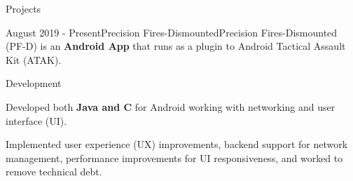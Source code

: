 \documentclass{article}
\newlength{\tabin}
\newlength{\secsep}
\newcommand{\lineunder}{\vspace*{-8pt} \\ \hspace*{-6pt} \hrulefill \\ \vspace*{-15pt}}
\newenvironment{tabbedsection}[1]{
	\begin{list}{}{
			\setlength{\itemsep}{0pt}
			\setlength{\labelsep}{0pt}
			\setlength{\labelwidth}{0pt}
			\setlength{\leftmargin}{0pt}
			\setlength{\rightmargin}{\tabin}
			\setlength{\listparindent}{0pt}
			\setlength{\parsep}{0pt}
			\setlength{\parskip}{0pt}
			\setlength{\partopsep}{0pt}
			\setlength{\topsep}{#1}
		}
		\item[]
	}{\end{list}}
\newenvironment{resume_section}[1]{
	\filbreak
	\vspace{2\secsep}
	\textsc{\color{blue}\large#1}
	\lineunder
	\begin{tabbedsection}{\secsep}
	}{\end{tabbedsection}}
\newenvironment{resume_subsection}[2]{
	\textbf{\color{BlueViolet}#2} \hfill {\normalsize (#1)} \hspace{-5em}
	\begin{tabbedsection}{0.5\secsep}
		\begin{subitems}
		}{\end{subitems}\end{tabbedsection}}
\newenvironment{resume_project_subsection}[3]{
	\textbf{\color{BlueViolet}#2} \hfill \hspace{-5em} {\normalsize (#1)}
	\\ {\small \textit{ #3}}
	\begin{tabbedsection}{0.5\secsep}
		\begin{subitems}
		}{\end{subitems}\end{tabbedsection}}
\newenvironment{subitems}{
	\renewcommand{\labelitemi}{-}
	\begin{itemize}
		\setlength{\labelsep}{1em}
	}{\end{itemize}}
\newenvironment{resume_skill_group}[1]{
	\hspace{-18pt}\textbf{#1}
	\begin{itemize}
	}{\end{itemize}}
\begin{document}
\begin{resume_section}{Projects}
\begin{resume_project_subsection}{August 2019 - Present}{Precision Fires-Dismounted}{Precision Fires-Dismounted (PF-D) is an \textbf{Android App} that runs as a plugin to Android Tactical Assault Kit (ATAK).}
\begin{resume_skill_group}{Development}
					\item
					Developed both \textbf{Java and C} for Android working with networking and user interface (UI).
					\item
					Implemented user experience (UX) improvements, backend support for network
					management, performance improvements for UI responsiveness, and worked to remove technical debt. 
					\iffalse
					\item 
					Implemented basic geographical calculations. 
					\item 
					Initiated the development of a code generation tool to implement a standard message specification. 
					\fi
				\end{resume_skill_group}
		\end{resume_project_subsection}
		\vspace{2\secsep}
		
		\iffalse
		\begin{resume_project_subsection}{June 2019 - September 2019}{Radio Timing Tool}{This application is currently in use to establish the modem timing configurations used to create field networks for tactical digital communications.}
				\item 
					Worked to create a command line interface and assisted in debugging the capturing of timing parameters for \textbf{Python} application.
		\end{resume_project_subsection}
		\vspace{2\secsep}
		\fi
		
		\iffalse
		\begin{resume_subsection}{August 2017 - May 2019}{University Robotics Competition Team}
			\begin{itemize}
				\item 
					As a member of multiple sub teams, using C++ programmed kinematics for Rover’s waypoint navigation, calculated distance of
					objects to Rover given Computer Vision data.
				\item 
					Lead the communications and user interface team.
			\end{itemize}
		\end{resume_subsection}
		\vspace{2\secsep}
		\begin{resume_subsection}{Fall 2018}{Mobile Robotics Project}
			Programmed in C++ to implemented GPS navigation, path planning, and tennis ball (object) detection for autonomous traversal task.
			Using the random error from GPS measurements, created a random searching method. Interfacing programs and data with Robotic
			Operating System. Created simple reactive obstacle avoidance and a waypoint navigation inspired by bug algorithm.
		\end{resume_subsection}
		\fi
	\end{resume_section}
	
\end{document}
